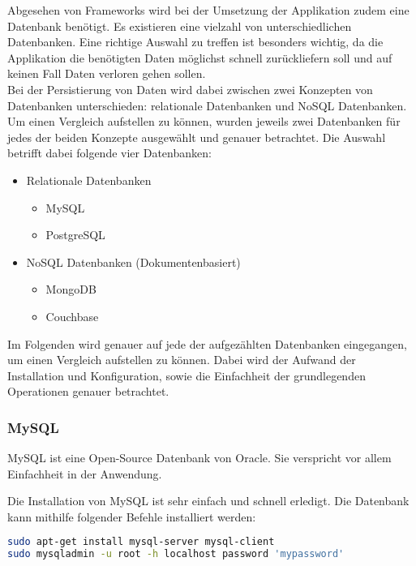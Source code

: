 
Abgesehen von Frameworks wird bei der Umsetzung der Applikation zudem eine Datenbank benötigt. Es existieren eine vielzahl von unterschiedlichen Datenbanken. Eine richtige Auswahl zu treffen ist besonders wichtig, da die Applikation die benötigten Daten möglichst schnell zurückliefern soll und auf keinen Fall Daten verloren gehen sollen. \\
Bei der Persistierung von Daten wird dabei zwischen zwei Konzepten von Datenbanken unterschieden: relationale Datenbanken und NoSQL Datenbanken. Um einen Vergleich aufstellen zu können, wurden jeweils zwei Datenbanken für jedes der beiden Konzepte ausgewählt und genauer betrachtet. Die Auswahl betrifft dabei folgende vier Datenbanken:\\
\begin{itemize}
\item Relationale Datenbanken
\begin{itemize}
\item MySQL
\item PostgreSQL
\end{itemize}
\item NoSQL Datenbanken (Dokumentenbasiert)
\begin{itemize}
\item MongoDB
\item Couchbase
\end{itemize}
\end{itemize}

Im Folgenden wird genauer auf jede der aufgezählten Datenbanken eingegangen, um einen Vergleich aufstellen zu können. Dabei wird der Aufwand der Installation und Konfiguration, sowie die Einfachheit der grundlegenden Operationen genauer betrachtet.

\subsubsection{MySQL}
\label{subsubsec:mysql}
MySQL ist eine Open-Source Datenbank von Oracle. Sie verspricht vor allem Einfachheit in der Anwendung.\cite{ABOUTMYSQL}

Die Installation von MySQL ist sehr einfach und schnell erledigt. Die Datenbank kann mithilfe folgender Befehle installiert werden:
\begin{lstlisting}[caption=Installation von MySQL \cite{MYSQLINSTALL}, language=bash]
sudo apt-get install mysql-server mysql-client
sudo mysqladmin -u root -h localhost password 'mypassword'
\end{lstlisting}

